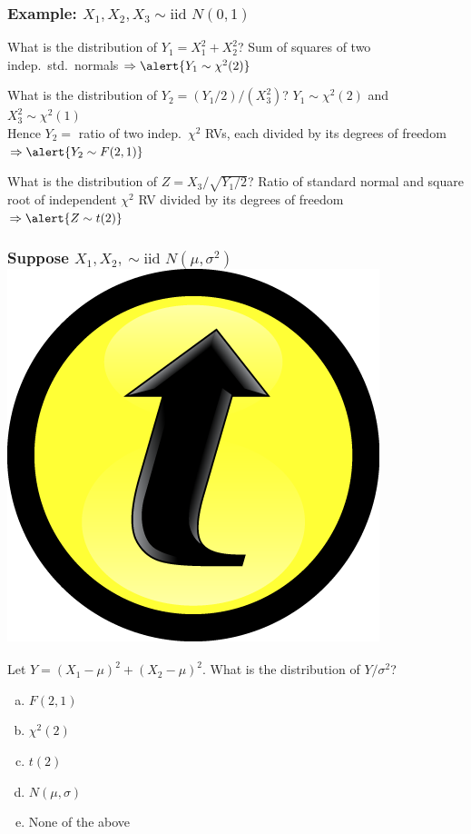 \documentclass[handout]{beamer}
\begin{document}
\begin{frame}
\frametitle{Example: $X_1, X_2, X_3 \sim \mbox{iid } N(0, 1)$}
\begin{block}{What is the distribution of $Y_1 = X_1^2 + X_2^2$?}\pause
Sum of squares of two indep.\ std.\ normals $\Rightarrow \alert{Y_1 \sim \chi^2(2)}$
\end{block}
\pause
\begin{block}{What is the distribution of $Y_2 = (Y_1/2)/(X_3^2)$?}
\pause
$Y_1 \sim \chi^2(2)$ and $X_3^2 \sim \chi^2(1)$\\
\pause
\vspace{1em}
Hence $Y_2 =$ ratio of two indep.\ $\chi^2$ RVs, each divided by its degrees of freedom $\Rightarrow \alert{Y_2 \sim F(2,1)}$
\end{block}
\pause
\begin{block}{What is the distribution of $Z = X_3/\sqrt{Y_1/2}$?}
\pause
Ratio of standard normal and square root of independent $\chi^2$ RV divided by its degrees of freedom $\Rightarrow \alert{Z \sim t(2)}$
\end{block}
\end{frame}
\begin{frame}
\frametitle{Suppose $X_1, X_2, \sim \mbox{iid } N(\mu, \sigma^2)$ \hfill \includegraphics[scale = 0.05]{./images/clicker}}
Let $Y = \left( X_1 - \mu\right)^2 + \left( X_2 - \mu\right)^2$. What is the distribution of $Y/\sigma^2$?

\begin{enumerate}[(a)]
	\item $F(2,1)$
	\item $\chi^2(2)$
	\item $t(2)$
	\item $N(\mu, \sigma)$
	\item None of the above
\end{enumerate}

\end{frame}
\end{document}
